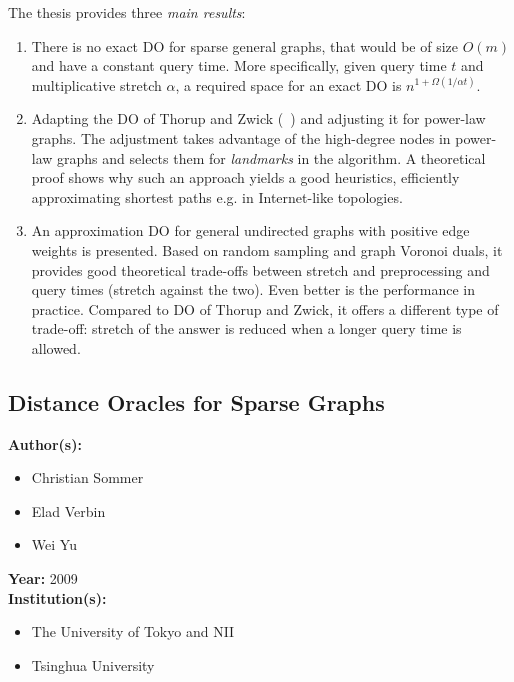 \documentclass[a4paper]{article}
\newenvironment{itemizesp}
{
    \begin{itemize}
}
{
    \end{itemize}
}
\newcommand{\textbff}[1]{{\large \textbf{#1}}}
\begin{document}
        The thesis provides three \emph{main results}: \\
        \begin{enumerate}
            \item There is no exact DO for sparse general graphs, that would be of size $O(m)$ and have a constant query time. More specifically, given query time $t$ and multiplicative stretch $\alpha$, a required space for an exact DO is $n^{1 + \Omega(1/\alpha t)}$.
            \item Adapting the DO of Thorup and Zwick (~\cite{apxdo05}) and adjusting it for power-law graphs. The adjustment takes advantage of the high-degree nodes in power-law graphs and selects them for \emph{landmarks} in the algorithm. A theoretical proof shows why such an approach yields a good heuristics, efficiently approximating shortest paths e.g. in Internet-like topologies.
            \item An approximation DO for general undirected graphs with positive edge weights is presented. Based on random sampling and graph Voronoi duals, it provides good theoretical trade-offs between stretch and preprocessing and query times (stretch against the two). Even better is the performance in practice. Compared to DO of Thorup and Zwick, it offers a different type of trade-off: stretch of the answer is reduced when a longer query time is allowed.
        \end{enumerate}


        \subsection{Distance Oracles for Sparse Graphs}
        \label{subsec:sparse}

        \textbff{Author(s): }
        \begin{itemizesp}
            \item Christian Sommer
            \item Elad Verbin
            \item Wei Yu
        \end{itemizesp}
        \textbff{Year: }2009 \\
        \textbff{Institution(s): }
        \begin{itemizesp}
            \item The University of Tokyo and NII
            \item Tsinghua University
        \end{itemizesp}
\end{document}

